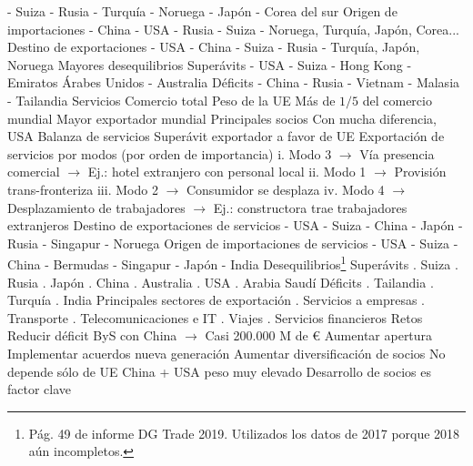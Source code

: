 \documentclass{nuevotema}
\begin{document}
\begin{esquemal}
				 - Suiza
				 - Rusia
				 - Turquía
				 - Noruega
				 - Japón
				 - Corea del sur
				\4 Origen de importaciones
				 - China
				 - USA
				 - Rusia
				 - Suiza
				 - Noruega, Turquía, Japón, Corea...
				\4 Destino de exportaciones
				 - USA
				 - China
				 - Suiza
				 - Rusia
				 - Turquía, Japón, Noruega
				\4 Mayores desequilibrios
				\4[] Superávits
				 - USA
				 - Suiza
				 - Hong Kong
				 - Emiratos Árabes Unidos
				 - Australia
				\4[] Déficits
				 - China
				 - Rusia
				 - Vietnam
				 - Malasia
				 - Tailandia
			\3 Servicios
				\4 Comercio total
				\4 Peso de la UE
				\4[] Más de $1/5$ del comercio mundial
				\4[] Mayor exportador mundial
				\4 Principales socios
				\4[] Con mucha diferencia, USA
				\4 Balanza de servicios
				\4[] Superávit exportador a favor de UE
				\4 Exportación de servicios por modos
				\4[] (por orden de importancia)
				\4[] i. Modo 3
				\4[] $\to$ Vía presencia comercial
				\4[] $\to$ Ej.: hotel extranjero con personal local
				\4[] ii. Modo 1
				\4[] $\to$ Provisión trans-fronteriza
				\4[] iii. Modo 2
				\4[] $\to$ Consumidor se desplaza
				\4[] iv. Modo 4
				\4[] $\to$ Desplazamiento de trabajadores
				\4[] $\to$ Ej.: constructora trae trabajadores extranjeros
				\4 Destino de exportaciones de servicios
				 - USA
				 - Suiza
				 - China
				 - Japón
				 - Rusia
				 - Singapur
				 - Noruega
				\4 Origen de importaciones de servicios
				 - USA
				 - Suiza
				 - China
				 - Bermudas
				 - Singapur
				 - Japón
				 - India
				\4 Desequilibrios\footnote{Pág. 49 de informe DG Trade 2019. Utilizados los datos de 2017 porque 2018 aún incompletos.}
				\4[] Superávits
				. Suiza
				. Rusia
				. Japón
				. China
				. Australia
				. USA
				. Arabia Saudí
				\4[] Déficits
				. Tailandia
				. Turquía
				. India
				\4 Principales sectores de exportación
				. Servicios a empresas
				. Transporte
				. Telecomunicaciones e IT
				. Viajes
				. Servicios financieros
			\3 Retos
				\4 Reducir déficit ByS con China
				\4[] $\to$ Casi 200.000 M de €
				\4 Aumentar apertura
				\4 Implementar acuerdos nueva generación
				\4 Aumentar diversificación de socios
				\4[] No depende sólo de UE
				\4[] China + USA peso muy elevado
				\4[] Desarrollo de socios es factor clave

\end{esquemal}
\end{document}
